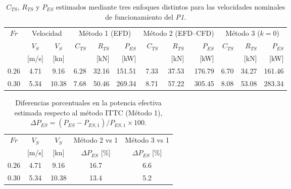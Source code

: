 \begin{table}[htbp]
\caption{$C_{TS}$, $R_{TS}$ y $P_{ES}$ estimados mediante tres enfoques distintos para las velocidades nominales de funcionamiento del \textit{P1}.}

\label{tbl:metodos_abs}
\scriptsize
\centering

\begin{tabular}{c c c
    r r r
    r r r
    r r r}
\toprule
\multirow{2}{*}{$Fr$} &
\multicolumn{2}{c}{Velocidad} &
\multicolumn{3}{c}{Método 1 (EFD)} &
\multicolumn{3}{c}{Método 2 (EFD--CFD)} &
\multicolumn{3}{c}{Método 3 ($k=0$)} \\
\cmidrule(lr){2-3}
\cmidrule(lr){4-6}
\cmidrule(lr){7-9}
\cmidrule(lr){10-12}
 & $V_S$ & $V_S$ &
 $C_{TS}$ & $R_{TS}$ & $P_{ES}$ &
 $C_{TS}$ & $R_{TS}$ & $P_{ES}$ &
 $C_{TS}$ & $R_{TS}$ & $P_{ES}$ \\
 & {[m/s]} & {[kn]} &
 & {[kN]} & {[kW]} &
 & {[kN]} & {[kW]} &
 & {[kN]} & {[kW]} \\
\midrule
0.26 & 4.71 & 9.16
     & 6.28 & 32.16 & 151.51
     & 7.33 & 37.53 & 176.79
     & 6.70 & 34.27 & 161.46 \\
0.30 & 5.34 & 10.38
     & 7.68 & 50.46 & 269.34
     & 8.71 & 57.22 & 305.45
     & 8.08 & 53.08 & 283.34 \\
\bottomrule
\end{tabular}
\end{table}

\begin{table}[htbp]
\caption{Diferencias porcentuales en la potencia efectiva estimada respecto al método ITTC (Método 1), $\Delta P_{ES} = (P_{ES} - P_{ES,1})/P_{ES,1}\times 100$.}
\label{tbl:metodos_delta}
\scriptsize
\centering

\begin{tabular}{c c c c c}
\toprule
$Fr$ & $V_S$ & $V_S$ & Método 2 vs 1 & Método 3 vs 1 \\
     & {[m/s]} & {[kn]} & {$\Delta P_{ES}$ [\%]} & {$\Delta P_{ES}$ [\%]} \\
\midrule
0.26 & 4.71 & 9.16  & 16.7 & 6.6 \\
0.30 & 5.34 & 10.38 & 13.4 & 5.2 \\
\bottomrule
\end{tabular}

\end{table}




